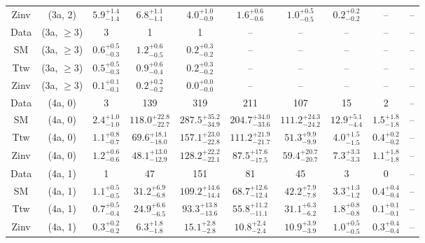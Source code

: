 \begin{table}[h!]
{\begin{tabular}{cccccccccc}
	Zinv & (3a, 2) & $5.9^{+ 1.4 }_{- 1.4 }$ & $6.8^{+ 1.1 }_{- 1.1 }$ & $4.0^{+ 1.0 }_{- 0.9 }$ & $1.6^{+ 0.6 }_{- 0.6 }$ & $1.0^{+ 0.5 }_{- 0.5 }$ & $0.2^{+ 0.2 }_{- 0.2 }$ & -- & -- \\[0.5ex] 
	Data & (3a, $\ge3$) & 3 & 1 & 1 & -- & -- & -- & -- & -- \\[0.5ex] 
	SM & (3a, $\ge3$) & $0.6^{+ 0.5 }_{- 0.3 }$ & $1.2^{+ 0.6 }_{- 0.5 }$ & $0.2^{+ 0.3 }_{- 0.2 }$ & -- & -- & -- & -- & -- \\[0.5ex] 
	Ttw & (3a, $\ge3$) & $0.5^{+ 0.5 }_{- 0.3 }$ & $0.9^{+ 0.6 }_{- 0.4 }$ & $0.2^{+ 0.3 }_{- 0.2 }$ & -- & -- & -- & -- & -- \\[0.5ex] 
	Zinv & (3a, $\ge3$) & $0.1^{+ 0.1 }_{- 0.1 }$ & $0.2^{+ 0.2 }_{- 0.2 }$ & $0.0^{+ 0.0 }_{- 0.0 }$ & -- & -- & -- & -- & -- \\[0.5ex] 
	Data & (4a, 0) & 3 & 139 & 319 & 211 & 107 & 15 & 2 & -- \\[0.5ex] 
	SM & (4a, 0) & $2.4^{+ 1.0 }_{- 1.0 }$ & $118.0^{+ 22.8 }_{- 22.7 }$ & $287.5^{+ 35.2 }_{- 34.9 }$ & $204.7^{+ 34.0 }_{- 33.6 }$ & $111.2^{+ 24.3 }_{- 24.2 }$ & $12.9^{+ 5.1 }_{- 4.4 }$ & $1.5^{+ 1.8 }_{- 1.8 }$ & -- \\[0.5ex] 
	Ttw & (4a, 0) & $1.1^{+ 0.8 }_{- 0.7 }$ & $69.6^{+ 18.1 }_{- 18.0 }$ & $157.1^{+ 23.0 }_{- 22.8 }$ & $111.2^{+ 21.9 }_{- 21.7 }$ & $51.3^{+ 9.9 }_{- 9.9 }$ & $4.0^{+ 1.5 }_{- 1.5 }$ & $0.4^{+ 0.2 }_{- 0.2 }$ & -- \\[0.5ex] 
	Zinv & (4a, 0) & $1.2^{+ 0.6 }_{- 0.6 }$ & $48.1^{+ 13.0 }_{- 12.9 }$ & $128.2^{+ 22.2 }_{- 22.1 }$ & $87.5^{+ 17.6 }_{- 17.5 }$ & $59.4^{+ 20.7 }_{- 20.7 }$ & $7.3^{+ 3.3 }_{- 3.3 }$ & $1.1^{+ 1.8 }_{- 1.8 }$ & -- \\[0.5ex] 
	Data & (4a, 1) & 1 & 47 & 151 & 81 & 45 & 3 & 0 & -- \\[0.5ex] 
	SM & (4a, 1) & $1.1^{+ 0.5 }_{- 0.5 }$ & $31.2^{+ 6.9 }_{- 6.8 }$ & $109.2^{+ 14.6 }_{- 14.4 }$ & $68.7^{+ 12.6 }_{- 12.4 }$ & $42.2^{+ 7.9 }_{- 7.8 }$ & $3.3^{+ 1.3 }_{- 1.2 }$ & $0.4^{+ 0.4 }_{- 0.4 }$ & -- \\[0.5ex] 
	Ttw & (4a, 1) & $0.7^{+ 0.5 }_{- 0.4 }$ & $24.9^{+ 6.6 }_{- 6.5 }$ & $93.3^{+ 13.8 }_{- 13.6 }$ & $55.8^{+ 11.2 }_{- 11.1 }$ & $31.1^{+ 6.3 }_{- 6.2 }$ & $1.8^{+ 0.8 }_{- 0.8 }$ & $0.1^{+ 0.1 }_{- 0.1 }$ & -- \\[0.5ex] 
	Zinv & (4a, 1) & $0.3^{+ 0.2 }_{- 0.2 }$ & $6.3^{+ 1.8 }_{- 1.8 }$ & $15.1^{+ 2.8 }_{- 2.8 }$ & $10.8^{+ 2.4 }_{- 2.4 }$ & $10.9^{+ 3.9 }_{- 3.9 }$ & $1.0^{+ 0.5 }_{- 0.5 }$ & $0.3^{+ 0.4 }_{- 0.4 }$ & -- \\[0.5ex] 

\end{tabular}}
\end{table}
